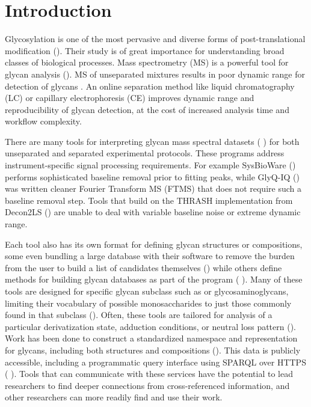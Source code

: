 \section{Introduction}
Glycosylation is one of the most pervasive and diverse forms of
post-translational modification (\cite{Varki2017}). Their study
is of great importance for understanding broad classes of biological
processes. Mass spectrometry (MS) is a powerful tool for glycan
analysis (\cite{Zaia2008}). MS of unseparated mixtures results in poor
dynamic range for detection of glycans \cite{Peltoniemi2013}. An online
separation method like liquid chromatography (LC) or capillary
electrophoresis (CE) improves dynamic range and reproducibility of
glycan detection, at the cost of increased analysis time and workflow
complexity.

There are many tools for interpreting glycan mass spectral datasets (
\cite{Yu2013,Peltoniemi2013,Kronewitter2014,Goldberg2009,Maxwell2012,Ceroni2008,Frank2010})
for both unseparated and separated experimental protocols. These programs address
instrument-specific signal processing requirements. For example SysBioWare
(\cite{Frank2010}) performs sophisticated baseline removal prior to fitting
peaks, while GlyQ-IQ (\cite{Kronewitter2014}) was written cleaner Fourier Transform
MS (FTMS) that does not require such a baseline removal step. Tools that build on
the THRASH implementation from Decon2LS (\cite{Jaitly2009,Yu2013,Maxwell2012})
are unable to deal with variable baseline noise or extreme dynamic range.

Each tool also has its own format for defining glycan structures or compositions,
some even bundling a large database with their software to remove the burden from
the user to build a list of candidates themselves (\cite{Yu2013,Kronewitter2014,Goldberg2009})
while others define methods for building glycan databases as part of the program (
\cite{Maxwell2012,Ceroni2008}). Many of these tools are designed for specific glycan
subclass such as \nglycans or glycosaminoglycans, limiting their vocabulary of
possible monosaccharides to just those commonly found in that subclass
(\cite{Yu2013,Kronewitter2014,Peltoniemi2013,Goldberg2009}). Often, these tools are
tailored for analysis of a particular derivatization state, adduction conditions, or
neutral loss pattern (\cite{Yu2013,Peltoniemi2013,Maxwell2012}). Work has been done
to construct a standardized namespace and representation for glycans, including both
structures and compositions (\cite{Tiemeyer2017,Campbell2014}). This data is publicly
accessible, including a programmatic query interface using SPARQL over HTTPS (
\cite{Aoki-Kinoshita2015}). Tools that can communicate with these services have the
potential to lead researchers to find deeper connections from cross-referenced information,
and other researchers can more readily find and use their work.

